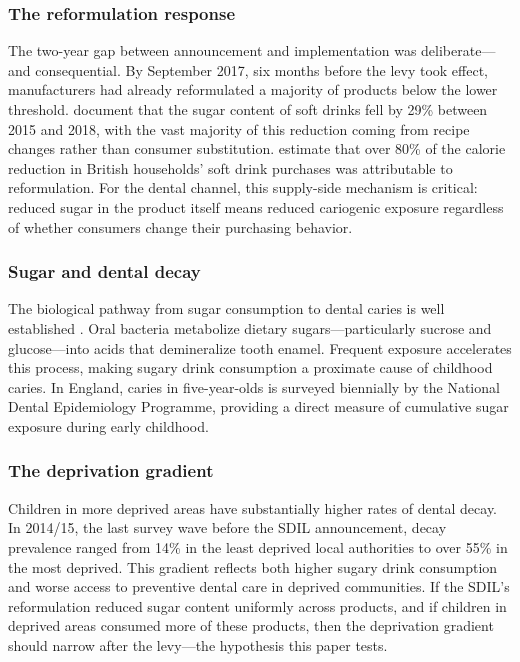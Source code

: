 \documentclass[12pt]{article}
\begin{document}
\subsubsection*{The reformulation response} The two-year gap between announcement and implementation was deliberate---and consequential. By September 2017, six months before the levy took effect, manufacturers had already reformulated a majority of products below the lower threshold. \citet{bandy2020reformulation} document that the sugar content of soft drinks fell by 29\% between 2015 and 2018, with the vast majority of this reduction coming from recipe changes rather than consumer substitution. \citet{pell2021sdilreformulation} estimate that over 80\% of the calorie reduction in British households' soft drink purchases was attributable to reformulation. For the dental channel, this supply-side mechanism is critical: reduced sugar in the product itself means reduced cariogenic exposure regardless of whether consumers change their purchasing behavior.

\subsubsection*{Sugar and dental decay} The biological pathway from sugar consumption to dental caries is well established \citep{moynihan2014sugarcaries}. Oral bacteria metabolize dietary sugars---particularly sucrose and glucose---into acids that demineralize tooth enamel. Frequent exposure accelerates this process, making sugary drink consumption a proximate cause of childhood caries. In England, caries in five-year-olds is surveyed biennially by the National Dental Epidemiology Programme, providing a direct measure of cumulative sugar exposure during early childhood.

\subsubsection*{The deprivation gradient} Children in more deprived areas have substantially higher rates of dental decay. In 2014/15, the last survey wave before the SDIL announcement, decay prevalence ranged from 14\% in the least deprived local authorities to over 55\% in the most deprived. This gradient reflects both higher sugary drink consumption and worse access to preventive dental care in deprived communities. If the SDIL's reformulation reduced sugar content uniformly across products, and if children in deprived areas consumed more of these products, then the deprivation gradient should narrow after the levy---the hypothesis this paper tests.
\end{document}
